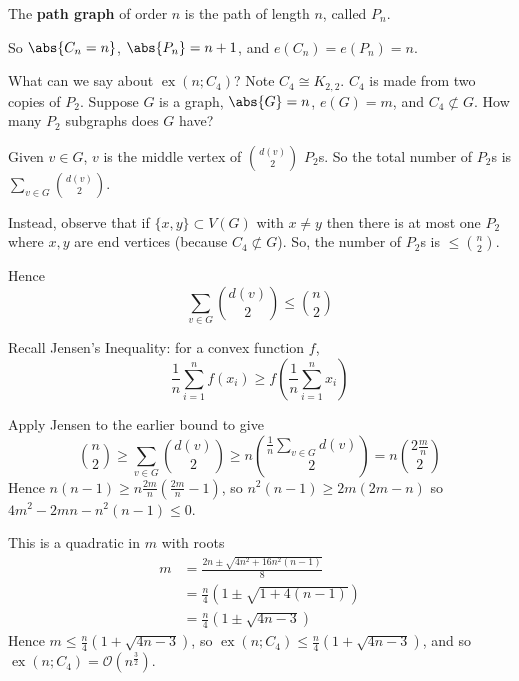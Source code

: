 \documentclass{article}
\DeclareMathOperator{\ext}{ex}
\begin{document}
\begin{defi}
    The \textbf{path graph} of order $n$ is the path of length $n$, called $P_n$.
\end{defi}

So $\abs{C_n = n}$, $\abs{P_n} = n+1$, and $e(C_n) = e(P_n) = n$.

\begin{eg}
    What can we say about $\ext(n; C_4)$? Note $C_4 \cong K_{2, 2}$.
    $C_4$ is made from two copies of $P_2$. Suppose $G$ is a graph, $\abs{G} = n$, $e(G) = m$, and $C_4 \not\subset G$. How many $P_2$ subgraphs does $G$ have?

    Given $v \in G$, $v$ is the middle vertex of $\binom{d(v)}{2}$ $P_2$s.
    So the total number of $P_2$s is $\sum_{v \in G} \binom{d(v)}{2}$.

    Instead, observe that if $\{x, y\} \subset V(G)$ with $x \neq y$ then there is at most one $P_2$ where $x, y$ are end vertices (because $C_4 \not\subset G$). So, the number of $P_2$s is $\leq \binom{n}{2}$.

    Hence \begin{equation*}\sum_{v \in G} \binom{d(v)}{2} \leq \binom{n}{2}\end{equation*}

    Recall Jensen's Inequality: for a convex function $f$,
    \begin{equation*}
        \frac{1}{n} \sum_{i=1}^n f(x_i) \geq f\left(\frac{1}{n} \sum_{i=1}^n x_i\right)
    \end{equation*}

    Apply Jensen to the earlier bound to give
    \begin{equation*}
        \binom{n}{2} \geq \sum_{v \in G} \binom{d(v)}{2} \geq n \binom{\frac{1}{n} \sum_{v \in G} d(v)}{2} = n \binom{2 \frac{m}{n}}{2}
    \end{equation*}
    Hence $n(n-1) \geq n \frac{2m}{n} (\frac{2m}{n} - 1)$, so $n^2 (n-1) \geq 2m (2m-n)$ so $4m^2 - 2mn - n^2 (n-1) \leq 0$.

    This is a quadratic in $m$ with roots
    \begin{align*}
        m &= \frac{2n \pm \sqrt{4 n^2 + 16 n^2(n-1)}}{8} \\
        &= \frac{n}{4}(1 \pm \sqrt{1 + 4\left(n-1\right)}) \\
        &= \frac{n}{4}\left(1 \pm \sqrt{4n - 3}\right)
    \end{align*}
    Hence $m \leq \frac{n}{4}\left(1 + \sqrt{4n-3}\right)$, so $\ext(n; C_4) \leq \frac{n}{4} \left(1 + \sqrt{4n-3}\right)$, and so $\ext(n; C_4) = \mathcal{O}\left(n^\frac{3}{2}\right)$.


\end{eg}
\end{document}
